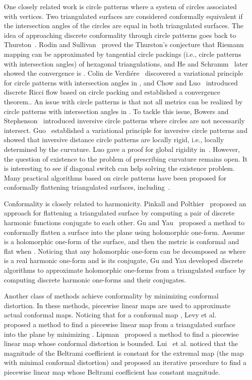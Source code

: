 \documentclass[11pt]{article}
\begin{document}
One closely related work is circle patterns where a system of circles associated with
vertices. Two triangulated surfaces are considered conformally equivalent if the 
intersection angles of the circles are equal in both triangulated surfaces. 
The idea of approaching discrete
conformality through circle patterns goes back to Thurston~\cite{Stephenson03}. 
Rodin and Sullivan~\cite{RS} proved the Thurston's conjecture that Riemann mapping 
can be approximated by tangential circle packings (i.e., circle patterns with  
intersection angles) of hexagonal triangulations, and He and Schramm~\cite{he98} 
later showed the convergence is . Colin de Verdi\'{e}re~\cite{verdiere} 
discovered a variational 
principle for circle patterns with intersection angles in , 
and Chow and Luo~\cite{chow} introduced discrete Ricci flow based on circle packing and 
established a convergence theorem.. 
An issue with circle patterns is that not all metrics can be realized by circle patterns with 
intersection angles in . To tackle this issue, Bowers and Stephenson~\cite{Bowers} 
introduced inversive circle patterns where circles are not necessarily intersect.
Guo~\cite{Guo} established a variational principle for inversive circle patterns 
and showed that inversive distance circle patterns are locally rigid, i.e., locally 
determined by the curvature. Luo gave a proof for global rigidity in~\cite{Luo2011}.
However, the question of existence to the problem of prescribing curvature 
remains open. It is interesting to see if diagonal switch can help solving the existence problem. 
Many practical algorithms based on circle patterns have been proposed for conformally 
flattening triangulated surfaces, including~\cite{Kharevych, Jin}.

Conformality is closely related to harmonicity. Pinkall and Polthier~\cite{pinkall} proposed
an approach for flattening a triangulated surface by computing a pair of 
discrete harmonic functions conjugate to each other. 
Gu and Yau~\cite{Gu:2003} proposed a method to conformally flatten a surface
into the plane using holomorphic one-form. Assume  is a 
holomorphic one-form of the surface, and then the metric 
 is conformal and flat when . 
Noticing that any holomorphic one-form can be decomposed as 
 where  is a real harmonic one-form and 
 is its conjugate, Gu and Yau developed discrete algorithms
to approximate holomorphic one-forms from a triangulated surface by 
computing discrete harmonic one-forms and their conjugates. 


Another class of methods achieve conformality by minimizing conformal distortion. 
In these methods, piecewise linear maps are used to approximate actual conformal maps. 
Noticing that  for a conformal map , 
Levy et al.~\cite{Levy} proposed a method to find a piecewise linear map  from a 
triangulated surface into the plane by minimizing . 
Lipman~\cite{Lipman12} proposed a method to find a piecewise linear map  whose
conformal distortion  is bounded. 
Lui~\cite{Lui} et al. noticed that the magnitude of the Beltrami coefficient 
 is constant for the extremal map  
(the map with minimal conformal distortion) and proposed an iterative procedure 
to find a piecewise linear map  whose Beltrami coefficient has constant magnitude. 
\end{document}
